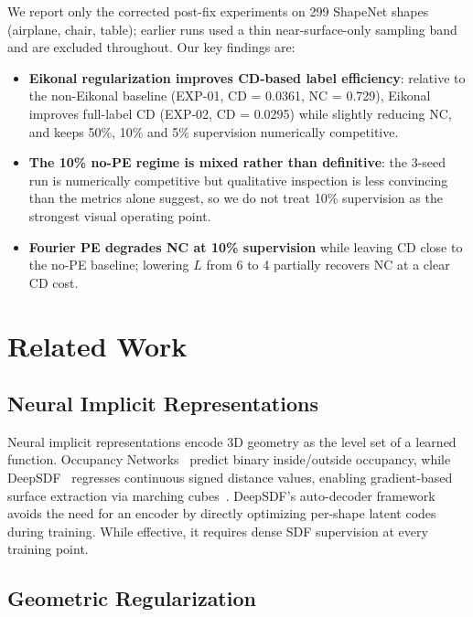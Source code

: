 \documentclass[conference]{IEEEtran}
\begin{document}
We report only the corrected post-fix experiments on 299 ShapeNet shapes (airplane, chair, table); earlier runs used a thin near-surface-only sampling band and are excluded throughout. Our key findings are:
\begin{itemize}
    \item \textbf{Eikonal regularization improves CD-based label efficiency}: relative to the non-Eikonal baseline (EXP-01, CD = 0.0361, NC = 0.729), Eikonal improves full-label CD (EXP-02, CD = 0.0295) while slightly reducing NC, and keeps 50\%, 10\% and 5\% supervision numerically competitive.
    \item \textbf{The 10\% no-PE regime is mixed rather than definitive}: the 3-seed run is numerically competitive but qualitative inspection is less convincing than the metrics alone suggest, so we do not treat 10\% supervision as the strongest visual operating point.
    \item \textbf{Fourier PE degrades NC at 10\% supervision} while leaving CD close to the no-PE baseline; lowering $L$ from 6 to 4 partially recovers NC at a clear CD cost.
\end{itemize}

\section{Related Work}

\subsection{Neural Implicit Representations}

Neural implicit representations encode 3D geometry as the level set of a learned function. Occupancy Networks~\cite{occnet} predict binary inside/outside occupancy, while DeepSDF~\cite{deepsdf} regresses continuous signed distance values, enabling gradient-based surface extraction via marching cubes~\cite{marchingcubes}. DeepSDF's auto-decoder framework avoids the need for an encoder by directly optimizing per-shape latent codes during training. While effective, it requires dense SDF supervision at every training point.

\subsection{Geometric Regularization}
\end{document}
